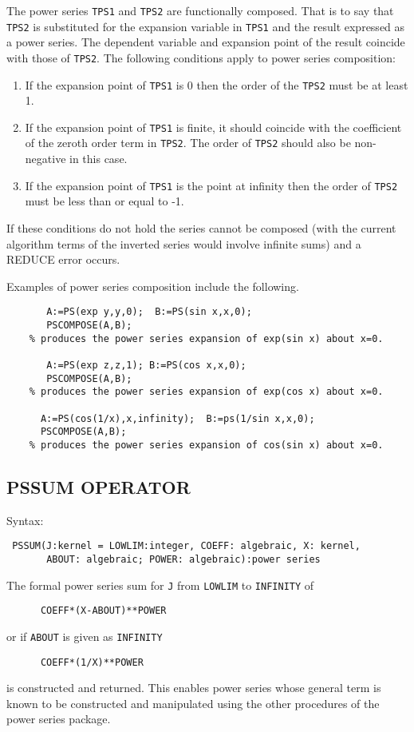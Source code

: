 The power series {\tt TPS1} and {\tt TPS2} are functionally composed.
That is to say that {\tt TPS2} is substituted for the expansion
variable in {\tt TPS1} and the result expressed as a power series. The
dependent variable and expansion point of the result coincide with
those of {\tt TPS2}.  The following conditions apply to power series
composition:

\begin{enumerate}
\item If the expansion point of {\tt TPS1} is 0 then the order of the
{\tt TPS2} must be at least 1.

\item If the expansion point of {\tt TPS1} is finite, it should
coincide with the coefficient of the zeroth order term in {\tt TPS2}.
The order of {\tt TPS2} should also be non-negative in this case.

\item If the expansion point of {\tt TPS1} is the point at infinity
then the order of {\tt TPS2} must be less than or equal to -1.

\end{enumerate}

If these conditions do not hold the series cannot be composed (with
the current algorithm terms of the inverted series would involve
infinite sums) and a REDUCE error occurs.

\noindent Examples of power series composition include the following.
\begin{verbatim}
       A:=PS(exp y,y,0);  B:=PS(sin x,x,0); 
       PSCOMPOSE(A,B);
    % produces the power series expansion of exp(sin x) about x=0.

       A:=PS(exp z,z,1); B:=PS(cos x,x,0);
       PSCOMPOSE(A,B);
    % produces the power series expansion of exp(cos x) about x=0.

      A:=PS(cos(1/x),x,infinity);  B:=ps(1/sin x,x,0);
      PSCOMPOSE(A,B);
    % produces the power series expansion of cos(sin x) about x=0.
\end{verbatim}

\subsection*{PSSUM OPERATOR}

Syntax:
\begin{verbatim}
 PSSUM(J:kernel = LOWLIM:integer, COEFF: algebraic, X: kernel,
       ABOUT: algebraic; POWER: algebraic):power series
\end{verbatim}
The formal power series sum for {\tt J} from {\tt LOWLIM} to {\tt INFINITY} of 
\begin{verbatim}
      COEFF*(X-ABOUT)**POWER
\end{verbatim}
or if {\tt ABOUT} is given as {\tt INFINITY}
\begin{verbatim}
      COEFF*(1/X)**POWER
\end{verbatim}
is constructed and returned. This enables power series whose general
term is known to be constructed and manipulated using the other
procedures of the power series package. 


